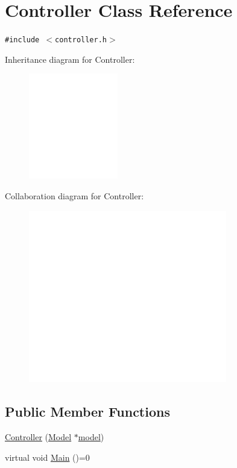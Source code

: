 \hypertarget{classController}{
\section{Controller Class Reference}
\label{classController}
}
{\tt \#include $<$controller.h$>$}

Inheritance diagram for Controller:\nopagebreak
\begin{figure}[H]
\begin{center}
\leavevmode
\includegraphics[width=110pt]{classController__inherit__graph}
\end{center}
\end{figure}
Collaboration diagram for Controller:\nopagebreak
\begin{figure}[H]
\begin{center}
\leavevmode
\includegraphics[width=245pt]{classController__coll__graph}
\end{center}
\end{figure}
\subsection*{Public Member Functions}
\begin{CompactItemize}
\item 
\hyperlink{classController_a3ca66cfc1e32af3f9b7563acf494277}{Controller} (\hyperlink{classModel}{Model} $\ast$\hyperlink{classController_6f6ea54052742d3940adfcfce885bae9}{model})
\item 
virtual void \hyperlink{classController_efeb521047c5b5d1c3f97290d015cacf}{Main} ()=0
\end{CompactItemize}
